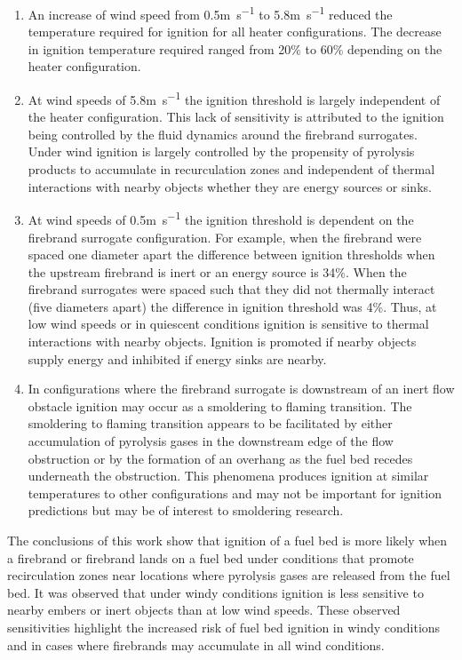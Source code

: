         \begin{enumerate}
            \item An increase of wind speed from 0.5\si{\meter\per\second} to 5.8\si{\meter\per\second} reduced the temperature required for ignition for all heater configurations. The decrease in ignition temperature required ranged from 20\% to 60\% depending on the heater configuration. 
            
            \item At wind speeds of 5.8\si{\meter\per\second} the ignition threshold is largely independent of the heater configuration. This lack of sensitivity is attributed to the ignition being controlled by the fluid dynamics around the firebrand surrogates. Under wind ignition is largely controlled by the propensity of pyrolysis products to accumulate in recurculation zones and independent of thermal interactions with nearby objects whether they are energy sources or sinks. 
            \item At wind speeds of 0.5\si{\meter\per\second} the ignition threshold is dependent on the firebrand surrogate configuration. For example, when the firebrand were spaced one diameter apart the difference between ignition thresholds when the upstream firebrand is inert or an energy source is 34\%. When the firebrand surrogates were spaced such that they did not thermally interact (five diameters apart) the difference in ignition threshold was 4\%. Thus, at low wind speeds or in quiescent conditions ignition is sensitive to thermal interactions with nearby objects. Ignition is promoted if nearby objects supply energy and inhibited if energy sinks are nearby. 
            
            \item In configurations where the firebrand surrogate is downstream of an inert flow obstacle ignition may occur as a smoldering to flaming transition. The smoldering to flaming transition appears to be facilitated by either accumulation of pyrolysis gases in the downstream edge of the flow obstruction or by the formation of an overhang as the fuel bed recedes underneath the obstruction. This phenomena produces ignition at similar temperatures to other configurations and may not be important for ignition predictions but may be of interest to smoldering research. 
        \end{enumerate}
    The conclusions of this work show that ignition of a fuel bed is more likely when a firebrand or firebrand lands on a fuel bed under conditions that promote recirculation zones near locations where pyrolysis gases are released from the fuel bed. It was observed that under windy conditions ignition is less sensitive to nearby embers or inert objects than at low wind speeds. These observed sensitivities highlight the increased risk of fuel bed ignition in windy conditions and in cases where firebrands may accumulate in all wind conditions. 